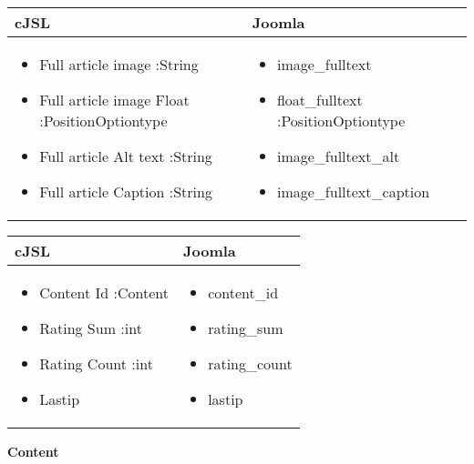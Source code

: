 \begin{minipage}{0.65\textwidth}
\begin{tabular}{|p{} | p{}|}
\hline
\textbf{cJSL} & \textbf{Joomla} \\ 
\hline
\begin{itemize}
\item Full article image :String
\item Full article image Float :PositionOptiontype
\item Full article  Alt text :String
\item Full article Caption :String
\end{itemize}
 & 
 \begin{itemize}
\item image\_fulltext 
\item float\_fulltext :PositionOptiontype
\item image\_fulltext\_alt 
\item image\_fulltext\_caption
 \end{itemize}
\\
\hline
\end{tabular}
\end{minipage}

\begin{minipage}{0.7\textwidth}
\begin{tabular}{|p{} | p{}|}
\hline
\textbf{cJSL} & \textbf{Joomla} \\ 
\hline
\begin{itemize}
\item Content Id :Content
\item Rating Sum :int
\item Rating Count :int
\item Lastip
\end{itemize}
 & 
\begin{itemize}
\item content\_id
\item rating\_sum
\item rating\_count
\item lastip
\end{itemize}
\\
\hline
\end{tabular}
\end{minipage}

\textbf{Content}

